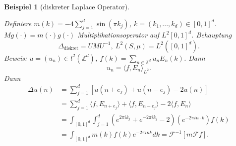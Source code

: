 \documentclass[12pt]{extreport} %
\newtheorem{Beispiel}[Satz]{Beispiel}
\numberwithin{equation}{section}
\newcommand{\Z}{\mathbb{Z}} %
\newcommand{\F}{\mathcal{F}}
\newcommand{\m}{\cdot}
\newcommand{\Bew}{\emph{Beweis: }}
\newcommand{\laplace}{\Delta}
\begin{document}
\begin{Beispiel}[diskreter Laplace Operator]
\begin{enumerate}[a)]
			Definiere $m(k) = -4\sum_{j = 1}^{d}\sin(\pi k_j)$, $k = (k_1,...,k_d)\in[0,1]^d$. $Mg(\m) = m(\m)g(\m)$ Multiplikationsoperator auf $L^2[0,1]^d$. Behauptung
			$$\laplace_{\text{diskret}} = UMU^{-1}, ~ L^2(S,\mu) = L^2([0,1]^d).$$
			\Bew $u = (u_n)\in l^2(\Z^d)$, $f(k) = \sum_{n\in \Z^d} u_n E_n(k)$. Dann $$u_n = \langle f,E_n\rangle_{L^2}.$$
			Dann
			\begin{align*}
				\laplace u(n) &= \sum_{j = 1}^{d}[u(n+e_j)+u(n-e_j)-2u(n)]\\
				&=\sum_{j = 1}^{d} \langle f, E_{n+e_j}\rangle +\langle f, E_{n-e_j}\rangle - 2 \langle f, E_n\rangle \\
				&= \int_{[0,1]^d} \int_{j = 1}^{d}(e^{2\pi i k_j} + e^{-2\pi i k_j} - 2)(e^{-2\pi i n\m k}) f(k)\\
				&= \int_{[0,1]^d} m(k) f(k) e^{-2\pi in k}dk = \F^{-1}[m\F f].
			\end{align*}
		\end{enumerate}
	\end{Beispiel}
	
\end{document}
